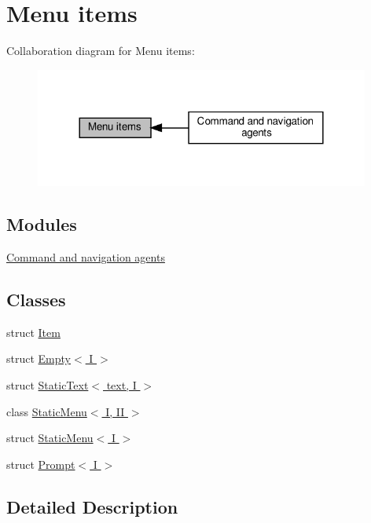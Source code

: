 \hypertarget{group__Items}{}\section{Menu items}
\label{group__Items}
Collaboration diagram for Menu items\+:\nopagebreak
\begin{figure}[H]
\begin{center}
\leavevmode
\includegraphics[width=312pt]{group__Items}
\end{center}
\end{figure}
\subsection*{Modules}
\begin{DoxyCompactItemize}
\item 
\hyperlink{group__Agents}{Command and navigation agents}
\end{DoxyCompactItemize}
\subsection*{Classes}
\begin{DoxyCompactItemize}
\item 
struct \hyperlink{structItem}{Item}
\item 
struct \hyperlink{structEmpty}{Empty$<$ I $>$}
\item 
struct \hyperlink{structStaticText}{Static\+Text$<$ text, I $>$}
\item 
class \hyperlink{classStaticMenu}{Static\+Menu$<$ I, I\+I $>$}
\item 
struct \hyperlink{structStaticMenu_3_01I_01_4}{Static\+Menu$<$ I $>$}
\item 
struct \hyperlink{structPrompt}{Prompt$<$ I $>$}
\end{DoxyCompactItemize}


\subsection{Detailed Description}
